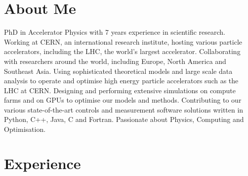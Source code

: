 \documentclass[11pt,a4paper,sans]{moderncv}        %
\begin{document}
\makecvtitle

\section{About Me}

PhD in Accelerator Physics with 7 years experience in scientific research.
Working at CERN, an international research institute, hosting various particle accelerators,
including the LHC, the world's largest accelerator.
Collaborating with researchers around the world,
including Europe, North America and Southeast Asia.
Using sophisticated theoretical models and large scale data analysis to operate and optimise
high energy particle accelerators such as the LHC at CERN.
Designing and performing extensive simulations on compute farms and on GPUs to optimise our models and methods.
Contributing to our various state-of-the-art controls and measurement software solutions written in
Python, C++, Java, C and Fortran.
Passionate about Physics, Computing and Optimisation.

\section{Experience}
\end{document}
